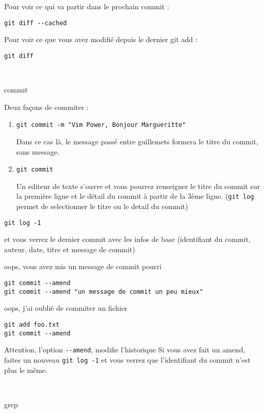 \documentclass[10pt]{exam}
\begin{document}
\begin{questions}
Pour voir ce qui va partir dans le prochain commit :
\begin{lstlisting}
git diff --cached
\end{lstlisting}

Pour voir ce que vous avez modifié depuis le dernier git add :
\begin{lstlisting}
git diff
\end{lstlisting}

~

\question commit

Deux façons de commiter : 
\begin{enumerate}
\item\begin{lstlisting}
git commit -m "Vim Power, Bonjour Margueritte"
\end{lstlisting}
Dans ce cas là, le message passé entre guillemets formera le titre du commit, sans message.

\item\begin{lstlisting}
git commit
\end{lstlisting}
Un editeur de texte s'ouvre et vous pourrez renseigner le titre du commit sur la première ligne et le détail du commit à partir de la 3ème ligne.
(\texttt{git log} permet de selectionner le titre ou le detail du commit)
\end{enumerate}

\begin{lstlisting}
git log -1
\end{lstlisting}
et vous verrez le dernier commit avec les infos de base (identifiant du commit, auteur, date, titre et message de commit)

oops, vous avez mis un message de commit pourri
\begin{lstlisting}
git commit --amend
git commit --amend "un message de commit un peu mieux"
\end{lstlisting}

oops, j'ai oublié de commiter un fichier
\begin{lstlisting}
git add foo.txt
git commit --amend
\end{lstlisting}

Attention, l'option \texttt{-{}-amend}, modifie l'historique
Si vous avez fait un amend, faites un nouveau \texttt{git log -1} et vous verrez que l'identifiant du commit n'est plus le même.

~

\question grep


\end{questions}
\end{document}
